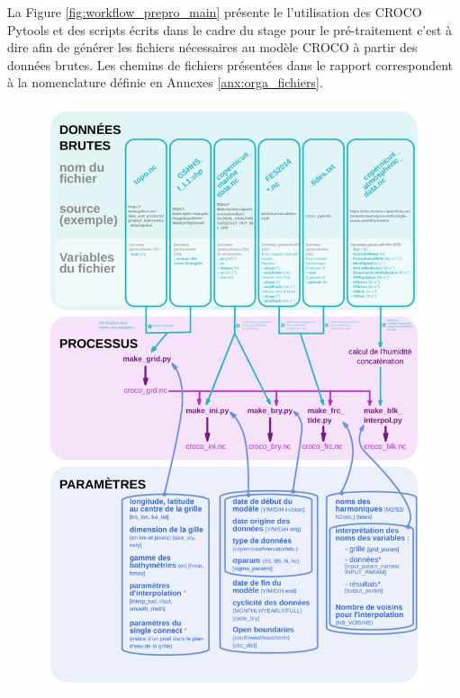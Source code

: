 \documentclass[10pt,a4paper,titlepage]{article}
\begin{document}
La Figure \ref{fig:workflow_prepro_main} présente le l'utilisation des CROCO Pytools et des scripts écrits dans le cadre du stage pour le pré-traitement c'est à dire afin de générer les fichiers nécessaires au modèle CROCO à partir des données brutes.
Les chemins de fichiers présentées dans le rapport correspondent à la nomenclature définie en Annexes \ref{anx:orga_fichiers}.

\begin{figure}[h!]
    \begin{center}
        \includegraphics[scale=0.35]{../images/workflow/graphe_data_process_mere.pdf}

\end{center}
\end{figure}
\end{document}
